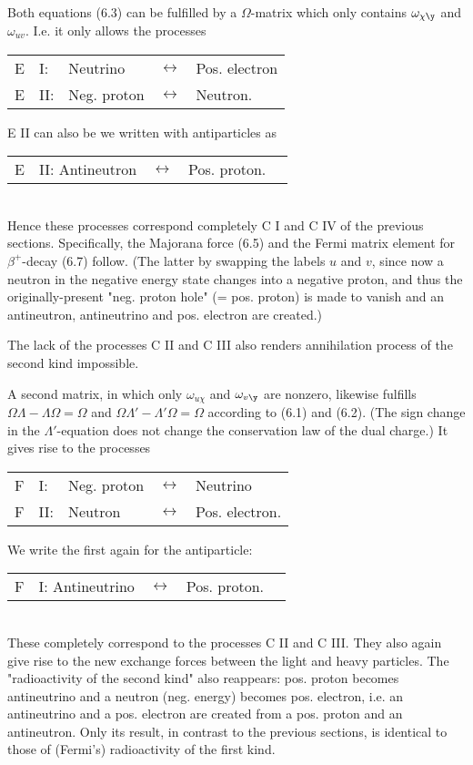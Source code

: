 \documentclass{article}
\begin{document}
Both equations (6.3) can be fulfilled by a $\Omega$-matrix which only contains $\omega_{\chi\y}$ and $\omega_{uv}$. I.e. it only allows the processes\\
\begin{tabular}{lllll}
E & I: & Neutrino & $\leftrightarrow$ & Pos. electron \\
E & II: & Neg. proton & $\leftrightarrow$ & Neutron.
\end{tabular}

E II can also be we written with antiparticles as\\
\begin{tabular}{lllll}
E & II: Antineutron & $\leftrightarrow$ & Pos. proton.
\end{tabular}\\
Hence these processes correspond completely  C I and C IV of the previous sections. Specifically, the Majorana force (6.5) and the Fermi matrix element for $\beta^+$-decay (6.7) follow. (The latter by swapping the labels $u$ and $v$, since now a neutron in the negative energy state changes into a negative proton, and thus the originally-present "neg. proton hole" (= pos. proton) is made to vanish and an antineutron, antineutrino and pos. electron are created.)

The lack of the processes C II and C III also renders annihilation process of the second kind impossible.

A second matrix, in which only $\omega_{u\chi}$ and $\omega_{v\y}$ are nonzero, likewise fulfills $\Omega\Lambda - \Lambda\Omega = \Omega$ and $\Omega\Lambda' - \Lambda'\Omega = \Omega$ according to (6.1) and (6.2). (The sign change in the $\Lambda'$-equation does not change the conservation law of the dual charge.) It gives rise to the processes\\
\begin{tabular}{lllll}
F & I: & Neg. proton & $\leftrightarrow$ & Neutrino \\
F & II: & Neutron & $\leftrightarrow$ & Pos. electron.
\end{tabular}

We write the first again for the antiparticle:\\
\begin{tabular}{lllll}
F & I: Antineutrino & $\leftrightarrow$ & Pos. proton.
\end{tabular}\\
These completely correspond to the processes C II and C III. They also again give rise to the new exchange forces between the light and heavy particles. The "radioactivity of the second kind" also reappears: pos. proton becomes antineutrino and a neutron (neg. energy) becomes pos. electron, i.e. an antineutrino and a pos. electron are created from a pos. proton and an antineutron. Only its result, in contrast to the previous sections, is identical to those of (Fermi's) radioactivity of the first kind.
\end{document}
